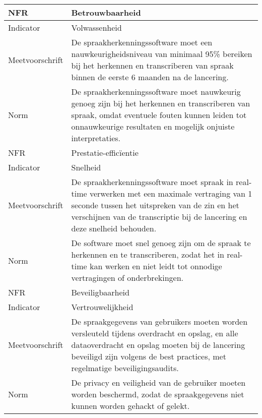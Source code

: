 \begin{center}
    \begin{tabular}{ |p{3cm}|p{11.5cm}| }
        \hline
        NFR & Betrouwbaarheid  \\
        \hline
        Indicator & Volwassenheid \\
        \hline
        Meetvoorschrift & De spraakherkenningssoftware moet een nauwkeurigheidsniveau van minimaal 95\% bereiken bij het herkennen en transcriberen van spraak binnen de eerste 6 maanden na de lancering.  \\
        \hline
        Norm & De spraakherkenningssoftware moet nauwkeurig genoeg zijn bij het herkennen en transcriberen van spraak, omdat eventuele fouten kunnen leiden tot onnauwkeurige resultaten en mogelijk onjuiste interpretaties. \\
        \hline\hline
        NFR & Prestatie-efficïentie \\
        \hline
        Indicator & Snelheid \\
        \hline
        Meetvoorschrift & De spraakherkenningssoftware moet spraak in real-time verwerken met een maximale vertraging van 1 seconde tussen het uitspreken van de zin en het verschijnen van de transcriptie bij de lancering en deze snelheid behouden. \\
        \hline
        Norm & De software moet snel genoeg zijn om de spraak te herkennen en te transcriberen, zodat het in real-time kan werken en niet leidt tot onnodige vertragingen of onderbrekingen. \\
        \hline\hline
        NFR & Beveiligbaarheid  \\
        \hline
        Indicator & Vertrouwelijkheid \\
        \hline
        Meetvoorschrift & De spraakgegevens van gebruikers moeten worden versleuteld tijdens overdracht en opslag, en alle dataoverdracht en opslag moeten bij de lancering beveiligd zijn volgens de best practices, met regelmatige beveiligingsaudits. \\
        \hline
        Norm & De privacy en veiligheid van de gebruiker moeten worden beschermd, zodat de spraakgegevens niet kunnen worden gehackt of gelekt. \\
        \hline
    \end{tabular}
\end{center}

\subsection{}%

